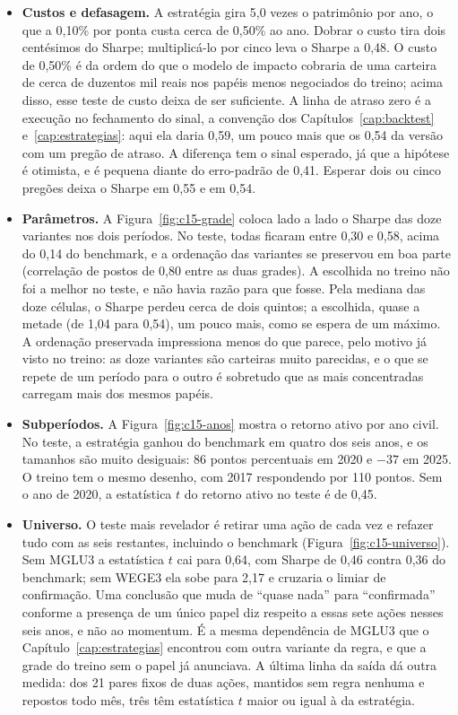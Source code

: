 \begin{itemize}
  \item \textbf{Custos e defasagem.} A estratégia gira 5,0 vezes o patrimônio por ano, o que a 0,10\% por ponta custa cerca de 0,50\% ao ano. Dobrar o custo tira dois centésimos do Sharpe; multiplicá-lo por cinco leva o Sharpe a 0,48. O custo de 0,50\% é da ordem do que o modelo de impacto cobraria de uma carteira de cerca de duzentos mil reais nos papéis menos negociados do treino; acima disso, esse teste de custo deixa de ser suficiente. A linha de atraso zero é a execução no fechamento do sinal, a convenção dos Capítulos~\ref{cap:backtest} e~\ref{cap:estrategias}: aqui ela daria 0,59, um pouco mais que os 0,54 da versão com um pregão de atraso. A diferença tem o sinal esperado, já que a hipótese é otimista, e é pequena diante do erro-padrão de 0,41. Esperar dois ou cinco pregões deixa o Sharpe em 0,55 e em 0,54.
  \item \textbf{Parâmetros.} A Figura~\ref{fig:c15-grade} coloca lado a lado o Sharpe das doze variantes nos dois períodos. No teste, todas ficaram entre 0,30 e 0,58, acima do 0,14 do benchmark, e a ordenação das variantes se preservou em boa parte (correlação de postos de 0,80 entre as duas grades). A escolhida no treino não foi a melhor no teste, e não havia razão para que fosse. Pela mediana das doze células, o Sharpe perdeu cerca de dois quintos; a escolhida, quase a metade (de 1,04 para 0,54), um pouco mais, como se espera de um máximo. A ordenação preservada impressiona menos do que parece, pelo motivo já visto no treino: as doze variantes são carteiras muito parecidas, e o que se repete de um período para o outro é sobretudo que as mais concentradas carregam mais dos mesmos papéis.
  \item \textbf{Subperíodos.} A Figura~\ref{fig:c15-anos} mostra o retorno ativo por ano civil. No teste, a estratégia ganhou do benchmark em quatro dos seis anos, e os tamanhos são muito desiguais: 86 pontos percentuais em 2020 e $-37$ em 2025. O treino tem o mesmo desenho, com 2017 respondendo por 110 pontos. Sem o ano de 2020, a estatística $t$ do retorno ativo no teste é de 0,45.
  \item \textbf{Universo.} O teste mais revelador é retirar uma ação de cada vez e refazer tudo com as seis restantes, incluindo o benchmark (Figura~\ref{fig:c15-universo}). Sem MGLU3 a estatística $t$ cai para 0,64, com Sharpe de 0,46 contra 0,36 do benchmark; sem WEGE3 ela sobe para 2,17 e cruzaria o limiar de confirmação. Uma conclusão que muda de ``quase nada'' para ``confirmada'' conforme a presença de um único papel diz respeito a essas sete ações nesses seis anos, e não ao momentum. É a mesma dependência de MGLU3 que o Capítulo~\ref{cap:estrategias} encontrou com outra variante da regra, e que a grade do treino sem o papel já anunciava. A última linha da saída dá outra medida: dos 21 pares fixos de duas ações, mantidos sem regra nenhuma e repostos todo mês, três têm estatística $t$ maior ou igual à da estratégia.
\end{itemize}

